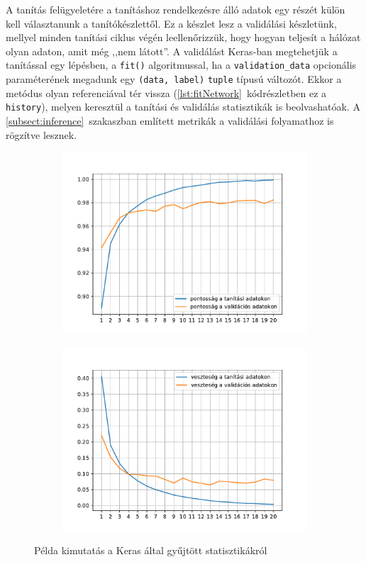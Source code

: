 A tanítás felügyeletére a tanításhoz rendelkezésre álló adatok egy részét külön kell választanunk a tanítókészlettől. Ez a készlet lesz a validálási készletünk, mellyel minden tanítási ciklus végén leellenőrizzük, hogy hogyan teljesít a hálózat olyan adaton, amit még ,,nem látott''. A validálást Keras-ban megtehetjük a tanítással egy lépésben, a \verb|fit()| algoritmussal, ha a \verb|validation_data| opcionális paraméterének megadunk egy \verb|(data, label)| \verb|tuple| típusú változót. Ekkor a metódus olyan referenciával tér vissza (\ref{lst:fitNetwork}~kódrészletben ez a \verb|history|), melyen keresztül a tanítási és validálás statisztikák is beolvashatóak. A \ref{subsect:inference}~szakaszban említett metrikák a validálási folyamathoz is rögzítve lesznek. 
\begin{figure}[H]
	\centering
	\begin{subfigure}{0.45\textwidth}
		\includegraphics[width=\textwidth]{fig/accuracy.pdf}
		\label{fig:plotacc}
	\end{subfigure}
	\quad
	\begin{subfigure}{0.45\textwidth}
		\includegraphics[width=\textwidth]{fig/loss.pdf}
		\label{fig:plotloss}
	\end{subfigure}
	\caption{Példa kimutatás a Keras által gyűjtött statisztikákról}
\end{figure}
